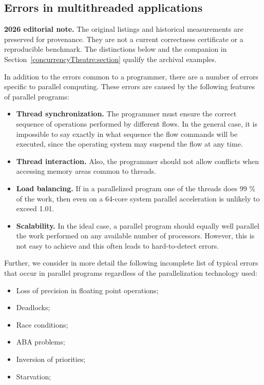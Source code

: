 { %
	\subsection{Errors in multithreaded applications}
	\par\textbf{2026 editorial note.} The original listings and historical measurements are preserved for provenance. They are not a current correctness certificate or a reproducible benchmark. The distinctions below and the companion in Section~\ref{concurrencyTheatre:section} qualify the archival examples.
	\par In addition to the errors common to a programmer, there are a number of errors specific to parallel computing. These errors are caused by the following features of parallel programs:
	\begin{itemize}
		\item\textbf{Thread synchronization.} The programmer must ensure the correct sequence of operations performed by different flows. In the general case, it is impossible to say exactly in what sequence the flow commands will be executed, since the operating system may suspend the flow at any time.
		\item\textbf{Thread interaction.} Also, the programmer should not allow conflicts when accessing memory areas common to threads.
		\item\textbf{Load balancing.} If in a parallelized program one of the threads does 99 \% of the work, then even on a 64-core system parallel acceleration is unlikely to exceed 1.01.
		\item\textbf{Scalability.} In the ideal case, a parallel program should equally well parallel the work performed on any available number of processors. However, this is not easy to achieve and this often leads to hard-to-detect errors.
	\end{itemize}
	\par Further, we consider in more detail the following incomplete list of typical errors that occur in parallel programs regardless of the parallelization technology used:
	\begin{itemize}
		\item Loss of precision in floating point operations;
		\item Deadlocks;
		\item Race conditions;
		\item ABA problems;
		\item Inversion of priorities;
		\item Starvation;

\end{itemize}}
